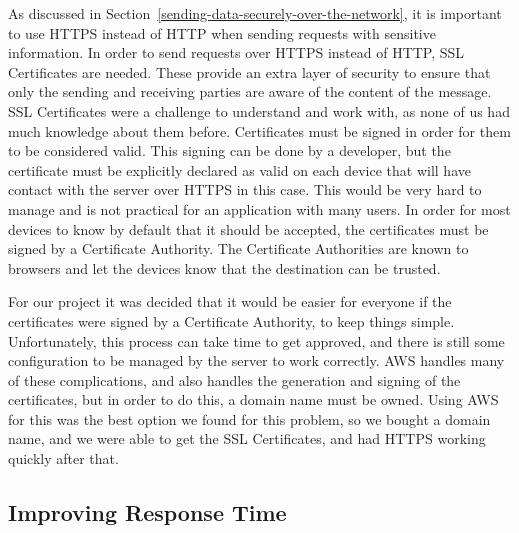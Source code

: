 \documentclass[12pt]{report}
\let\Oldsubsection\subsection
\renewcommand{\subsection}{\FloatBarrier\Oldsubsection}
\begin{document}
As discussed in Section~\ref{sending-data-securely-over-the-network}, it is important to use HTTPS
instead of HTTP when sending requests with sensitive information.
In order to send requests over HTTPS instead of HTTP, SSL Certificates are needed.
These provide an extra layer of security to ensure that only the sending and receiving parties are
aware of the content of the message.
SSL Certificates were a challenge to understand and work with, as none of us had much
knowledge about them before. Certificates must be signed in order for them to be considered
valid. This signing can be done by a developer, but the certificate must be explicitly declared as
valid on each device that will have contact with the server over HTTPS in this case. This would
be very hard to manage and is not practical for an application with many users. In order for most
devices to know by default that it should be accepted, the certificates must be signed by a
Certificate Authority. The Certificate Authorities are known to browsers and let the devices know
that the destination can be trusted.

For our project it was decided that it would be easier for everyone if the certificates were
signed by a Certificate Authority, to keep things simple. Unfortunately, this process can take
time to get approved, and there is still some configuration to be managed by the server to work
correctly. AWS handles many of these complications, and also handles the generation and
signing of the certificates, but in order to do this, a domain name must be owned. Using AWS for
this was the best option we found for this problem, so we bought a domain name, and we were
able to get the SSL Certificates, and had HTTPS working quickly after that.


\subsection{Improving Response Time} \label{improving-response-time}
\end{document}
